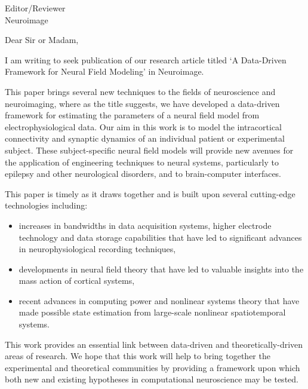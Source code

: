 \documentclass[a4paper,10pt]{letter}
\begin{document}
\vspace{-1cm}
\begin{letter}{Editor/Reviewer \\ Neuroimage}

\opening{Dear Sir or Madam,}




I am writing to seek publication of our research article titled `A Data-Driven Framework for Neural Field Modeling' in Neuroimage.

This paper brings several new techniques to the fields of neuroscience and neuroimaging, where as the title suggests, we have developed a data-driven framework for estimating the parameters of a neural field model from electrophysiological data. Our aim in this work is to model the intracortical connectivity and synaptic dynamics of an individual patient or experimental subject. These subject-specific neural field models will provide new avenues for the application of engineering techniques to neural systems, particularly to epilepsy and other neurological disorders, and to brain-computer interfaces.

This paper is timely as it draws together and is built upon several cutting-edge technologies including:
\begin{itemize}
	\item increases in bandwidths in data acquisition systems, higher electrode technology and data storage capabilities that have led to significant advances in neurophysiological recording techniques, 
	\item developments in neural field theory that have led to valuable insights into the mass action of cortical systems,
	\item recent advances in computing power and nonlinear systems theory that have made possible state estimation from large-scale nonlinear spatiotemporal systems.
\end{itemize}

This work provides an essential link between data-driven and theoretically-driven areas of research. We hope that this work will help to bring together the experimental and theoretical communities by providing a framework upon which both new and existing hypotheses in computational neuroscience may be tested.


\end{letter}
\end{document}
